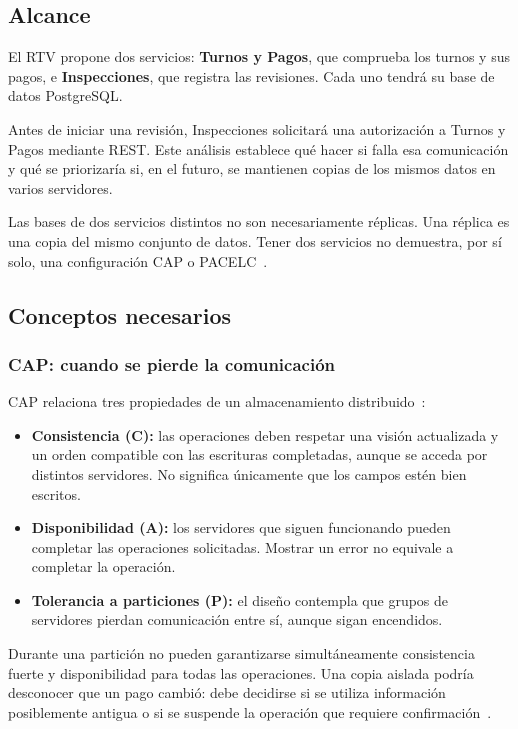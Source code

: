 \documentclass[11pt,a4paper]{article}
\begin{document}
\subsection{Alcance}

El RTV propone dos servicios: \textbf{Turnos y Pagos}, que comprueba los turnos y sus pagos, e \textbf{Inspecciones}, que registra las revisiones. Cada uno tendrá su base de datos PostgreSQL.

Antes de iniciar una revisión, Inspecciones solicitará una autorización a Turnos y Pagos mediante REST. Este análisis establece qué hacer si falla esa comunicación y qué se priorizaría si, en el futuro, se mantienen copias de los mismos datos en varios servidores.

Las bases de dos servicios distintos no son necesariamente réplicas. Una réplica es una copia del mismo conjunto de datos. Tener dos servicios no demuestra, por sí solo, una configuración CAP o PACELC~\cite{camilleri_horizontally_2024}.

\subsection{Conceptos necesarios}

\subsubsection{CAP: cuando se pierde la comunicación}

CAP relaciona tres propiedades de un almacenamiento distribuido~\cite{camilleri_horizontally_2024,calatrava_holistic_2022}:

\begin{itemize}[nosep]
  \item \textbf{Consistencia (C):} las operaciones deben respetar una visión actualizada y un orden compatible con las escrituras completadas, aunque se acceda por distintos servidores. No significa únicamente que los campos estén bien escritos.
  \item \textbf{Disponibilidad (A):} los servidores que siguen funcionando pueden completar las operaciones solicitadas. Mostrar un error no equivale a completar la operación.
  \item \textbf{Tolerancia a particiones (P):} el diseño contempla que grupos de servidores pierdan comunicación entre sí, aunque sigan encendidos.
\end{itemize}

Durante una partición no pueden garantizarse simultáneamente consistencia fuerte y disponibilidad para todas las operaciones. Una copia aislada podría desconocer que un pago cambió: debe decidirse si se utiliza información posiblemente antigua o si se suspende la operación que requiere confirmación~\cite{camilleri_horizontally_2024,calatrava_holistic_2022}.
\end{document}
